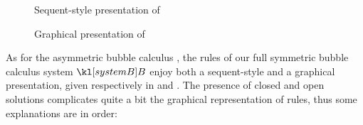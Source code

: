 %   

\begin{figure*}
  
  \caption{Sequent-style presentation of }
\end{figure*}

\begin{figure*}
  
  \caption{Graphical presentation of }
\end{figure*}

As for the asymmetric bubble calculus , the rules of our full symmetric
bubble calculus system $\sysB$ enjoy both a sequent-style and a graphical
presentation, given respectively in  and .
The presence of closed and open solutions complicates quite a bit the graphical
representation of rules, thus some explanations are in order:
